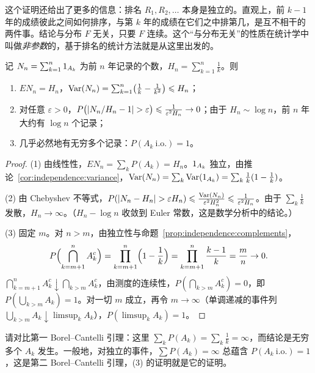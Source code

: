\begin{remark}
这个证明还给出了更多的信息：排名 $R_1,R_2,\dots$ 本身是独立的。直观上，前 $k-1$ 年的成绩彼此之间如何排序，与第 $k$ 年的成绩在它们之中排第几，是互不相干的两件事。结论与分布 $F$ 无关，只要 $F$ 连续。这个“与分布无关”的性质在统计学中叫做\emph{非参数}的，基于排名的统计方法就是从这里出发的。
\end{remark}

\begin{corollary}[记录的个数]\label{cor:independence:records-count}
记 $N_n=\sum_{k=1}^n1_{A_k}$ 为前 $n$ 年记录的个数，$H_n=\sum_{k=1}^n\frac1k$。则
\begin{enumerate}
\item $EN_n=H_n$，$\operatorname{Var}(N_n)=\sum_{k=1}^n\bigl(\frac1k-\frac1{k^2}\bigr)\leqslant H_n$；
\item 对任意 $\varepsilon>0$，$P\bigl(\lvert N_n/H_n-1\rvert>\varepsilon\bigr)\leqslant\frac1{\varepsilon^2H_n}\to0$；由于 $H_n\sim\log n$，前 $n$ 年大约有 $\log n$ 个记录；
\item 几乎必然地有无穷多个记录：$P(A_k\ \text{i.o.})=1$。
\end{enumerate}
\end{corollary}
\begin{proof}
(1) 由线性性，$EN_n=\sum_kP(A_k)=H_n$。$1_{A_k}$ 独立，由推论~\ref{cor:independence:variance}，$\operatorname{Var}(N_n)=\sum_k\operatorname{Var}(1_{A_k})=\sum_k\frac1k(1-\frac1k)$。

(2) 由 Chebyshev 不等式，$P(\lvert N_n-H_n\rvert>\varepsilon H_n)\leqslant\frac{\operatorname{Var}(N_n)}{\varepsilon^2H_n^2}\leqslant\frac1{\varepsilon^2H_n}$。由于 $\sum_k\frac1k$ 发散，$H_n\to\infty$。（$H_n-\log n$ 收敛到 Euler 常数，这是数学分析中的结论。）

(3) 固定 $m$。对 $n>m$，由独立性与命题~\ref{prop:independence:complements}，
\[
P\Bigl(\bigcap_{k=m+1}^nA_k^c\Bigr)=\prod_{k=m+1}^n\Bigl(1-\frac1k\Bigr)=\prod_{k=m+1}^n\frac{k-1}k=\frac mn\to0 .
\]
$\bigcap_{k=m+1}^nA_k^c\downarrow\bigcap_{k>m}A_k^c$，由测度的连续性，$P(\bigcap_{k>m}A_k^c)=0$，即 $P(\bigcup_{k>m}A_k)=1$。对一切 $m$ 成立，再令 $m\to\infty$（单调递减的事件列 $\bigcup_{k>m}A_k\downarrow\limsup_kA_k$），$P(\limsup_kA_k)=1$。
\end{proof}

请对比第一 Borel--Cantelli 引理：这里 $\sum_kP(A_k)=\sum_k\frac1k=\infty$，而结论是无穷多个 $A_k$ 发生。一般地，对独立的事件，$\sum P(A_k)=\infty$ 总蕴含 $P(A_k\ \text{i.o.})=1$，这是第二 Borel--Cantelli 引理，(3) 的证明就是它的证明。

